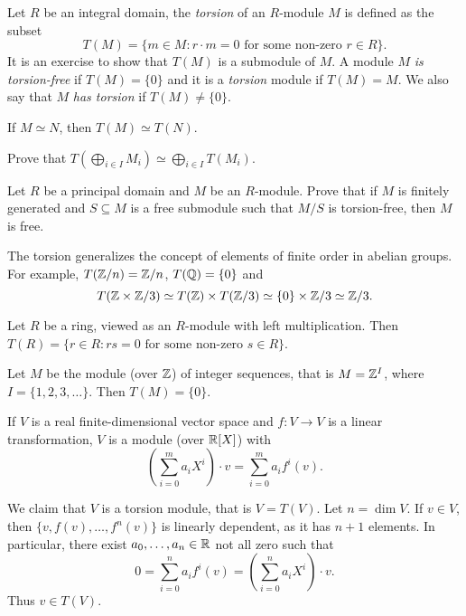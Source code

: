 Let $R$ be an integral domain, the \emph{torsion} of an $R$-module $M$ 
is defined as the subset 
\[
T(M)=\{m\in M:r\cdot m=0\text{ for some non-zero $r\in R$}\}.
\]
It is an exercise to show that $T(M)$ is a submodule of $M$. 
A module $M$ 
\emph{is torsion-free} if $T(M)=\{0\}$ and it is 
a \emph{torsion} module if $T(M)=M$.  We also say that $M$ \emph{has torsion}
if $T(M)\ne\{0\}$. 

\begin{exercise}
If $M\simeq N$, then $T(M)\simeq T(N)$.
\end{exercise}

\begin{exercise}
Prove that $T(\bigoplus_{i\in I}M_i)\simeq \bigoplus_{i\in I}T(M_i)$.
\end{exercise}

\begin{exercise}
\label{xca:free}
    Let $R$ be a principal domain and $M$ be an $R$-module. Prove that
    if $M$ is finitely generated and $S\subseteq M$ is a free submodule such that
    $M/S$ is torsion-free, then $M$ is free.
\end{exercise}

The torsion generalizes the concept of elements of finite order in abelian groups. For example, 
 $T(\mathbb{Z}/n)=\mathbb{Z}/n$, $T(\mathbb{Q})=\{0\}$ and
 \[
 T(\mathbb{Z}\times\mathbb{Z}/3)\simeq T(\mathbb{Z})\times T(\mathbb{Z}/3)\simeq \{0\}\times\mathbb{Z}/3\simeq\mathbb{Z}/3.
 \]

\begin{example}
    Let $R$ be a ring, viewed as an $R$-module with left multiplication. 
    Then $T(R)=\{r\in R:rs=0\text{ for some non-zero $s\in R$}\}$.
\end{example}

\begin{example}
    Let $M$ be the module (over $\mathbb{Z}$) of
    integer sequences, that is $M=\mathbb{Z}^I$, where 
    $I=\{1,2,3,\dots\}$. Then $T(M)=\{0\}$. 
\end{example}

\begin{example}
If $V$ is a real finite-dimensional vector space and $f\colon V\to V$ 
is a linear transformation, $V$ is a module (over $\mathbb{R}[X]$) 
with 
\[
\left(\sum_{i=0}^m a_iX^i\right)\cdot v=\sum_{i=0}^m a_if^i(v).
\]

We claim that 
$V$ is a torsion module, that is $V=T(V)$. Let $n=\dim V$. If $v\in V$, 
then $\{v,f(v),\dots,f^n(v)\}$ is linearly dependent, as it has 
$n+1$ elements. In particular, there exist $a_0,\dots,a_n\in\mathbb{R}$ not all zero such that
\[
0=\sum_{i=0}^n a_if^i(v)=\left(\sum_{i=0}^n a_iX^i\right)\cdot v.
\]
Thus $v\in T(V)$. 
\end{example}

